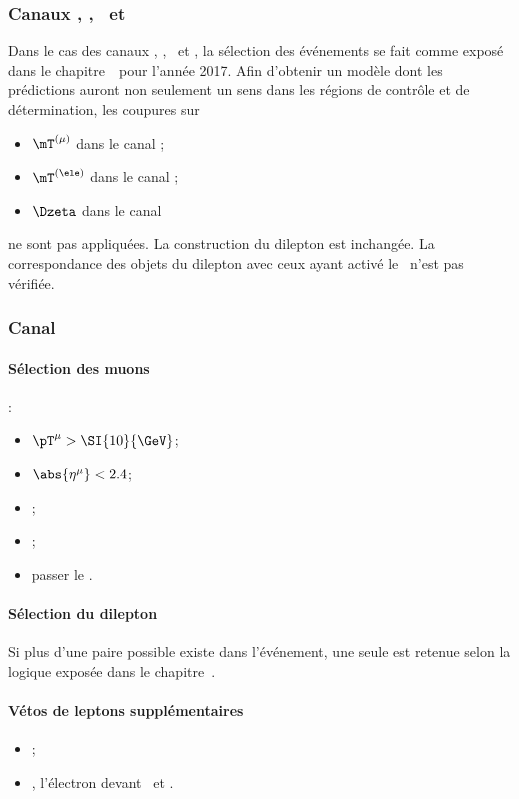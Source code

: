 \subsubsection{Canaux \tauh\tauh, \mu\tauh, \ele\tauh\ et \ele\mu}
Dans le cas des canaux
\tauh\tauh, \mu\tauh, \ele\tauh\ et \ele\mu,
la sélection des événements se fait comme exposé dans le chapitre~\ pour l'année 2017.
Afin d'obtenir un modèle dont les prédictions auront non seulement un sens dans les régions de contrôle et de détermination, les coupures sur
\begin{itemize}
\item $\mT^{(\mu)}$ dans le canal \mu\tauh;
\item $\mT^{(\ele)}$ dans le canal \ele\tauh;
\item $\Dzeta$ dans le canal \ele\mu
\end{itemize}
ne sont pas appliquées.
La construction du dilepton est inchangée.
La correspondance des objets du dilepton avec ceux ayant activé le \HLTpath\ n'est pas vérifiée.
\renewcommand{\IfMoreOnePair}{Si plus d'une paire possible existe dans l'événement, une seule est retenue selon la logique exposée dans le chapitre~\refChHTT.}
\subsubsection{Canal \mu\mu}
\paragraph{Sélection des muons}
:
\begin{itemize}
    \item $\pT^{\mu} > \SI{10}{\GeV}$;
    \item $\abs{\eta^{\mu}} < 2.4$;
    \item \Leptondzdxy;
    \item {};
    \item passer le \MediumMuonID.
\end{itemize}
\paragraph{Sélection du dilepton}
\AtLeastOneOSPair{\mu\mu}
\IfMoreOnePair
\paragraph{Vétos de leptons supplémentaires}
\LeptonVetoes
\begin{itemize}
    \item \LeptonVetoesExtraMuonMuMu;
    \item \LeptonVetoesExtraEle, l'électron devant \PassConversionVeto\ et \LessTwoMissingHitsVertex.
\end{itemize}
